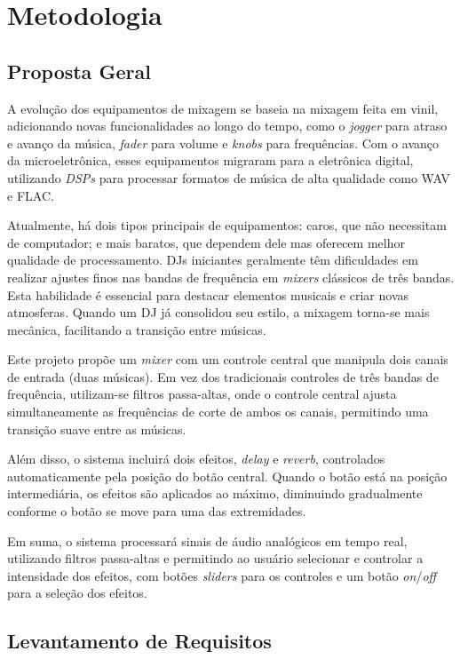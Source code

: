 \chapter[Metodologia]{Metodologia}


\section{Proposta Geral}
A evolução dos equipamentos de mixagem se baseia na mixagem feita em vinil, adicionando novas funcionalidades ao longo do tempo, como o \textit{jogger} para atraso e avanço da música, \textit{fader} para volume e \textit{knobs} para frequências. Com o avanço da microeletrônica, esses equipamentos migraram para a eletrônica digital, utilizando \textit{DSPs} para processar formatos de música de alta qualidade como WAV e FLAC.

Atualmente, há dois tipos principais de equipamentos: caros, que não necessitam de computador; e mais baratos, que dependem dele mas oferecem melhor qualidade de processamento. DJs iniciantes geralmente têm dificuldades em realizar ajustes finos nas bandas de frequência em \textit{mixers} clássicos de três bandas. Esta habilidade é essencial para destacar elementos musicais e criar novas atmosferas. Quando um DJ já consolidou seu estilo, a mixagem torna-se mais mecânica, facilitando a transição entre músicas.

Este projeto propõe um \textit{mixer} com um controle central que manipula dois canais de entrada (duas músicas). Em vez dos tradicionais controles de três bandas de frequência, utilizam-se filtros passa-altas, onde o controle central ajusta simultaneamente as frequências de corte de ambos os canais, permitindo uma transição suave entre as músicas.

Além disso, o sistema incluirá dois efeitos, \textit{delay} e \textit{reverb}, controlados automaticamente pela posição do botão central. Quando o botão está na posição intermediária, os efeitos são aplicados ao máximo, diminuindo gradualmente conforme o botão se move para uma das extremidades.

Em suma, o sistema processará sinais de áudio analógicos em tempo real, utilizando filtros passa-altas e permitindo ao usuário selecionar e controlar a intensidade dos efeitos, com botões \textit{sliders} para os controles e um botão \textit{on}/\textit{off} para a seleção dos efeitos.

\section{Levantamento de Requisitos}

